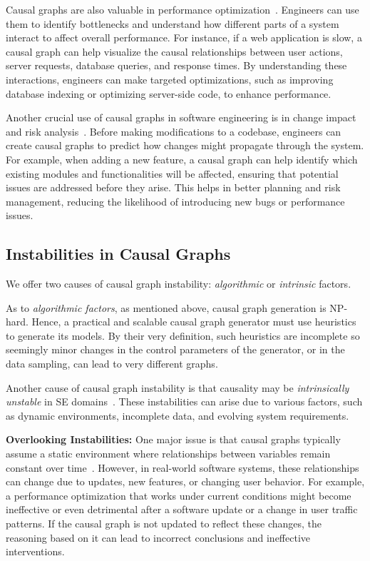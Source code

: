 \documentclass[]{svjour3}
\begin{document}
Causal graphs are also valuable in performance optimization~\cite{10.1007/978-3-030-59152-6_19, 10.1145/3492321.3519575, wu2019employing}. 
Engineers can use them to identify bottlenecks and understand how different parts of a system interact to affect overall performance. 
For instance, if a web application is slow, a causal graph can help visualize the causal relationships between user actions, server requests, database queries, and response times. 
By understanding these interactions, engineers can make targeted optimizations, such as improving database indexing or optimizing server-side code, to enhance performance.

Another crucial use of causal graphs in software engineering is in change impact and risk analysis~\cite{HU2013439}. 
Before making modifications to a codebase, engineers can create causal graphs to predict how changes might propagate through the system. 
For example, when adding a new feature, a causal graph can help identify which existing modules and functionalities will be affected, ensuring that potential issues are addressed before they arise. 
This helps in better planning and risk management, reducing the likelihood of introducing new bugs or performance issues.
 
\subsection{Instabilities in Causal Graphs}\label{why}

We offer two causes of causal graph instability: {\em algorithmic} or {\em intrinsic} factors.

As to {\em algorithmic factors},  as mentioned above, causal graph generation is NP-hard. Hence,   a practical and scalable causal graph generator must use heuristics to generate its models.
By their very definition, such heuristics are incomplete so seemingly minor changes in the control parameters of the generator, or in the data sampling, can lead to very different graphs.


Another cause of causal graph instability is that causality may be {\em intrinsically unstable} in SE domains~\cite{chindelevitch2012assessing}. 
These instabilities can arise due to various factors, such as dynamic environments, incomplete data,   and evolving system requirements.

 \textbf{Overlooking Instabilities:} One major issue is that causal graphs typically assume a static environment where relationships between variables remain constant over time~\cite{10.5555/2074284.2074334}. However, in real-world software systems, these relationships can change due to updates, new features, or changing user behavior. For example, a performance optimization that works under current conditions might become ineffective or even detrimental after a software update or a change in user traffic patterns. If the causal graph is not updated to reflect these changes, the reasoning based on it can lead to incorrect conclusions and ineffective interventions.
\end{document}
